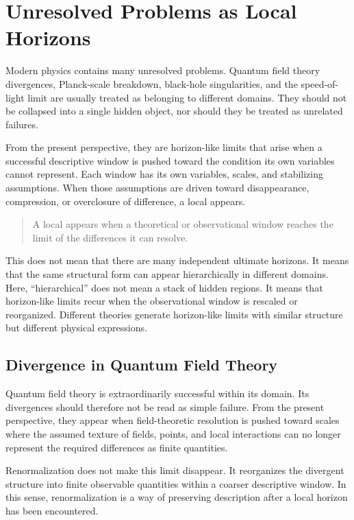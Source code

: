 \section{Unresolved Problems as Local Horizons}

\label{sec:unification}

Modern physics contains many unresolved problems.
Quantum field theory divergences,
Planck-scale breakdown,
black-hole singularities,
and the speed-of-light limit are usually treated as belonging to
different domains.
They should not be collapsed into a single hidden object,
nor should they be treated as unrelated failures.

From the present perspective,
they are horizon-like limits that arise when a successful descriptive
window is pushed toward the condition its own variables cannot
represent.
Each window has its own variables,
scales,
and stabilizing assumptions.
When those assumptions are driven toward disappearance,
compression,
or overclosure of difference,
a local \DH{} appears.

\medskip
\begin{quote}
A local \DH{} appears when a theoretical or observational window
reaches the limit of the differences it can resolve.
\end{quote}
\medskip

This does not mean that there are many independent ultimate horizons.
It means that the same structural form can appear hierarchically in
different domains.
Here,
``hierarchical'' does not mean a stack of hidden regions.
It means that horizon-like limits recur when the observational window
is rescaled or reorganized.
Different theories generate horizon-like limits with similar structure
but different physical expressions.

\subsection{Divergence in Quantum Field Theory}

Quantum field theory is extraordinarily successful within its domain.
Its divergences should therefore not be read as simple failure.
From the present perspective,
they appear when field-theoretic resolution is pushed toward scales
where the assumed texture of fields,
points,
and local interactions can no longer represent the required
differences as finite quantities.

Renormalization does not make this limit disappear.
It reorganizes the divergent structure into finite observable
quantities within a coarser descriptive window.
In this sense,
renormalization is a way of preserving description after a local
horizon has been encountered.

